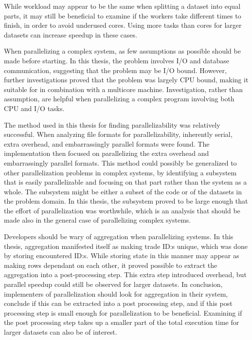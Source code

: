 While workload may appear to be the same when splitting a dataset into equal parts, it may still be beneficial to examine if
the workers take different times to finish, in order to avoid underused cores. Using more tasks than cores for larger datasets
can increase speedup in these cases.

When parallelizing a complex system, as few assumptions as possible should be made before starting. In this thesis, the problem
involves I/O and database communication, suggesting that the problem may be I/O bound. However, further investigations proved that the problem
was largely CPU bound, making it suitable for  in combination with a multicore machine. Investigation, rather than
assumption, are helpful when parallelizing a complex program involving both CPU and I/O tasks.

The method used in this thesis for finding parallelizability was relatively successful. When analyzing file formats for parallelizability,
inherently serial, extra overhead, and embarrassingly parallel formats were found. The implementation then focused on parallelizing
the extra overhead and embarrassingly parallel formats. This method could possibly be generalized to other parallelization problems
in complex systems, by identifying a subsystem that is easily parallelizable and focusing on that part rather than the system as a whole.
The subsystem might be either a subset of the code or of the datasets in the problem domain. In this thesis, the subsystem proved to be
large enough that the effort of parallelization was worthwhile, which is an analysis that should be made also in the general case of
parallelizing complex systems.

Developers should be wary of aggregation when parallelizing systems. In this thesis, aggregation manifested itself as making trade ID:s unique,
which was done by storing encountered ID:s. While storing state in this manner may appear as making rows dependant on each other, it proved
possible to extract the aggregation into a post-processing step. This extra step introduced overhead, but parallel speedup could still be 
observed for larger datasets. In conclusion, implementers of parallelization should look for aggregation in their system, conclude if this
can be extracted into a post processing step, and if this post processing step is small enough for parallelization to be beneficial. Examining
if the post processing step takes up a smaller part of the total execution time for larger datasets can also be of interest.

